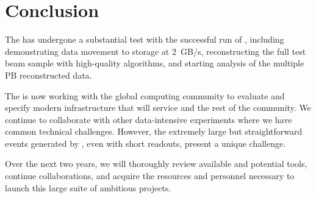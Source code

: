 \section{Conclusion}

The   has undergone a substantial test with the successful run of , including demonstrating data movement to storage at \SI{2}{GB/s}, reconstructing the full test beam sample with high-quality algorithms, and starting analysis of the multiple PB reconstructed data. 

The  is now working with the global  computing community to evaluate and specify modern infrastructure that will service  and the rest of the  community.  We continue to collaborate with other data-intensive experiments where we have common technical challenges. However, the extremely large but straightforward events generated by  , even with short readouts, present a unique challenge. 

Over the next two years, we  will thoroughly review available and potential tools, continue collaborations, and acquire the resources and personnel necessary to launch this large suite of ambitious projects. 
